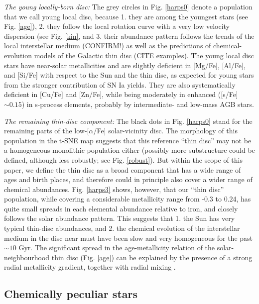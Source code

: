 \documentclass{aa}  %
\begin{document}
{\it The young locally-born disc:} The grey circles in Fig. \ref{harps0} denote a population that we call young local disc, because 1. they are among the youngest stars (see Fig. \ref{age}), 2. they follow the local rotation curve with a very low velocity dispersion (see Fig. \ref{kin}, and 3. their abundance pattern follows the trends of the local interstellar medium (CONFIRM!) as well as the predictions of chemical-evolution models of the Galactic thin disc (CITE examples). The young local disc stars have near-solar metallicities and are slightly deficient in [Mg/Fe], [Al/Fe], and [Si/Fe] with respect to the Sun and the thin disc, as expected for young stars from the stronger contribution of SN Ia yields. They are also systematically deficient in [Cu/Fe] and [Zn/Fe], while being moderately in enhanced ([s/Fe]$\sim0.15$) in s-process elements, probably by intermediate- and low-mass AGB stars. 

{\it The remaining thin-disc component:} The black dots in Fig. \ref{harps0} stand for the remaining parts of the low-[$\alpha$/Fe] solar-vicinity disc. The morphology of this population in the t-SNE map suggests that this reference ``thin disc'' may not be a homogeneous monolithic population either (possibly more substructure could be defined, although less robustly; see Fig. \ref{robust}). But within the scope of this paper, we define the thin disc as a broad component that has a wide range of ages and birth places, and therefore could in principle also cover a wider range of chemical abundances. Fig. \ref{harps3} shows, however, that our ``thin disc'' population, while covering a considerable metallicity range from -0.3 to 0.24, has quite small spreads in each elemental abundance relative to iron, and closely follows the solar abundance pattern. This suggests that 1. the Sun has very typical thin-disc abundances, and 2. the chemical evolution of the interstellar medium in the disc near must have been slow and very homogeneous for the past $\sim10$ Gyr. The significant spread in the age-metallicity relation of the solar-neighbourhood thin disc (Fig. \ref{age}) can be explained by the presence of a strong radial metallicity gradient, together with radial mixing \citep[e.g.][Minchev et al., in prep.]{Haywood2006, Minchev2013, Anders2017a}.

\subsection{Chemically peculiar stars}\label{peculiar}
\end{document}
